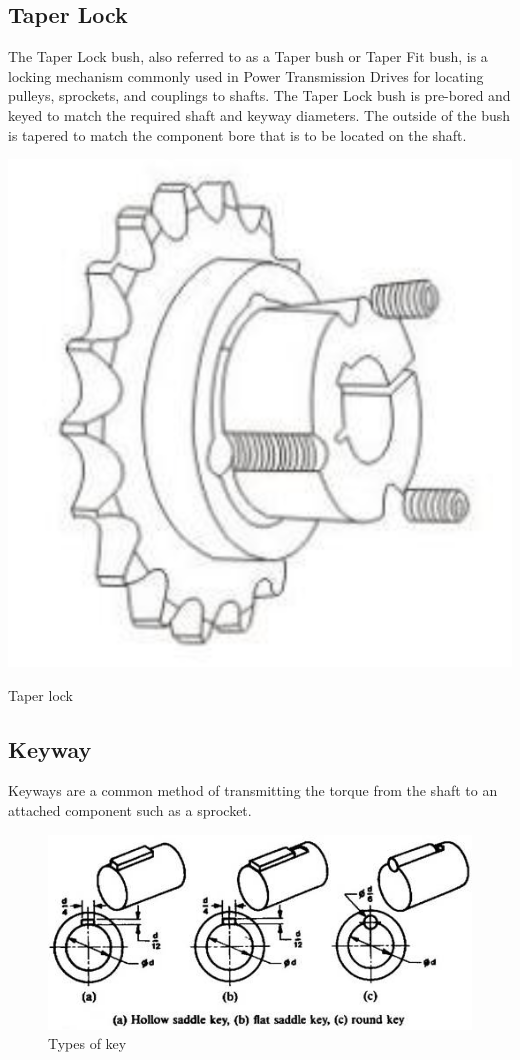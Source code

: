 \subsection{Taper Lock} 


The Taper Lock bush, also referred to as a Taper bush or Taper Fit bush, is a locking mechanism commonly used in Power Transmission Drives for locating pulleys, sprockets, and couplings to shafts. 
The Taper Lock bush is pre-bored and keyed to match the required shaft and keyway diameters. 
The outside of the bush is tapered to match the component bore that is to be located on the shaft.
\begin{marginfigure}
    \centering
    \includegraphics[width=\textwidth]{09_fixtures_and_fittings/taper-lock.png}
    \caption{Taper lock}
\end{marginfigure}

\subsection{Keyway} 

Keyways are a common method of transmitting the torque from the shaft to an attached component such as a sprocket.

\begin{figure}[h!]
    \centering
    \includegraphics[width=\textwidth]{09_fixtures_and_fittings/keys.jpg}
    \caption{Types of key}
\end{figure}

